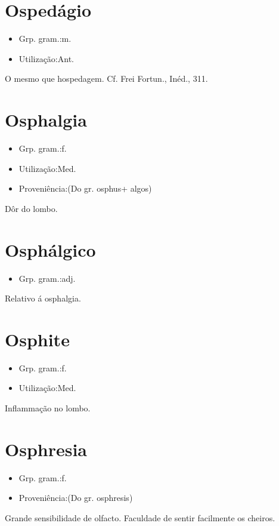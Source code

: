 \section{Ospedágio}
\begin{itemize}
\item {Grp. gram.:m.}
\end{itemize}
\begin{itemize}
\item {Utilização:Ant.}
\end{itemize}
O mesmo que \textunderscore hospedagem\textunderscore . Cf. Frei Fortun., \textunderscore Inéd.\textunderscore , 311.
\section{Osphalgia}
\begin{itemize}
\item {Grp. gram.:f.}
\end{itemize}
\begin{itemize}
\item {Utilização:Med.}
\end{itemize}
\begin{itemize}
\item {Proveniência:(Do gr. \textunderscore osphus\textunderscore  + \textunderscore algos\textunderscore )}
\end{itemize}
Dôr do lombo.
\section{Osphálgico}
\begin{itemize}
\item {Grp. gram.:adj.}
\end{itemize}
Relativo á osphalgia.
\section{Osphite}
\begin{itemize}
\item {Grp. gram.:f.}
\end{itemize}
\begin{itemize}
\item {Utilização:Med.}
\end{itemize}
Inflammação no lombo.
\section{Osphresia}
\begin{itemize}
\item {Grp. gram.:f.}
\end{itemize}
\begin{itemize}
\item {Proveniência:(Do gr. \textunderscore osphresis\textunderscore )}
\end{itemize}
Grande sensibilidade de olfacto.
Faculdade de sentir facilmente os cheiros.
